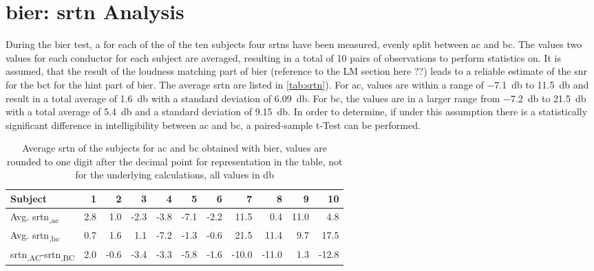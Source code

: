 \section{\gls{bier}: \gls{srtn} Analysis}\label{sec:result_srt}


During the \gls{bier} test, a for each of the of the ten subjects four \gls{srtn}s have been measured, evenly split between \gls{ac} and \gls{bc}.
The values two values for each conductor for each subject are averaged, resulting in a total of 10 pairs of observations to perform statistics on.
It is assumed, that the result of the loudness matching part of \gls{bier} (reference to the LM section here ??) leads to a reliable estimate of the \gls{snr} for the \gls{bct} for the \gls{hint} part of \gls{bier}.
The average \gls{srtn} are listed in \autoref{tab:srtn}). For \gls{ac}, values are within a range of \SI{-7.1}{\decibel} to \SI{11.5}{\decibel} and result in a total average of \SI{1.6}{\decibel} with a standard deviation of \SI{6.09}{\decibel}. For \gls{bc}, the values are in a larger range from \SI{-7.2}{\decibel} to  \SI{21.5}{\decibel} with a total average of \SI{5.4}{\decibel} and a standard deviation of \SI{9.15}{\decibel}.
In order to determine, if under this assumption there is a statistically significant difference in intelligibility between \gls{ac} and \gls{bc}, a paired-sample t-Test can be performed.\\

\begin{table}[H]
\centering
\caption{Average \gls{srtn} of the subjects for \gls{ac} and \gls{bc} obtained with \gls{bier}, values are rounded to one digit after the decimal point for representation in the table, not for the underlying calculations, all values in \si{\decibel}}
\label{tab:srtn}
\begin{tabular}{l|rrrrrrrrrr}
Subject     & 1   & 2    & 3    & 4    & 5    & 6    & 7     & 8     & 9    & 10   \\ \hline
Avg. \gls{srtn}\textsubscript{,\gls{ac}} & 2.8 & 1.0  & -2.3 & -3.8 & -7.1 & -2.2 & 11.5  & 0.4   & 11.0 & 4.8  \\
Avg. \gls{srtn}\textsubscript{,\gls{bc}} & 0.7 & 1.6  & 1.1  & -7.2 & -1.3 & -0.6 & 21.5  & 11.4  & 9.7  & 17.5 \\
\gls{srtn}\textsubscript{,AC}-\gls{srtn}\textsubscript{,BC}  & 2.0 & -0.6 & -3.4 & -3.3 & -5.8 & -1.6 & -10.0 & -11.0 & 1.3  & -12.8
\end{tabular}
\end{table}

